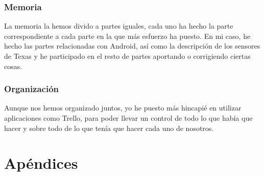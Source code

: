 \documentclass[11pt,spanish]{article}
\begin{document}
\subsubsection{Memoria} 
La memoria la hemos divido a partes iguales, cada uno ha hecho la parte correspondiente a cada parte en la que más esfuerzo ha puesto. En mi caso, he hecho las partes relacionadas con Android, así como la descripción de los sensores de Texas y he participado en el resto de partes aportando o corrigiendo ciertas cosas.

\subsubsection{Organización}
Aunque nos hemos organizado juntos, yo he puesto más hincapié en utilizar aplicaciones como Trello, para poder llevar un control de todo lo que había que hacer y sobre todo de lo que tenía que hacer cada uno de nosotros.
\newpage
\section{Apéndices}
\end{document}
